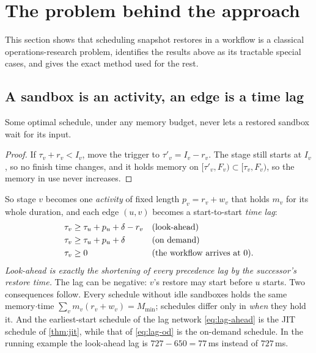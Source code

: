 \section{The problem behind the approach}
\label{sec:th-rcpsp}

This section shows that scheduling snapshot restores in a workflow is a classical
operations-research problem, identifies the results above as its tractable special cases, and
gives the exact method used for the rest.

\subsection{A sandbox is an activity, an edge is a time lag}

\begin{lemma}
\label{lem:noidle}
Some optimal schedule, under any memory budget, never lets a restored sandbox wait for its
input.
\end{lemma}

\begin{proof}
If $\tau_v + r_v < I_v$, move the trigger to $\tau'_v = I_v - r_v$. The stage still starts at
$I_v$, so no finish time changes, and it holds memory on $[\tau'_v, F_v) \subset [\tau_v, F_v)$,
so the memory in use never increases.
\end{proof}

So stage $v$ becomes one \emph{activity} of fixed length $p_v = r_v + w_v$ that holds $m_v$ for
its whole duration, and each edge $(u, v)$ becomes a start-to-start \emph{time lag}:
\begin{align}
  \tau_v &\ge \tau_u + p_u + \delta - r_v && \text{(look-ahead)} \label{eq:lag-ahead}\\
  \tau_v &\ge \tau_u + p_u + \delta       && \text{(on demand)}  \label{eq:lag-od}\\
  \tau_v &\ge 0 && \text{(the workflow arrives at $0$).} \notag
\end{align}
\emph{Look-ahead is exactly the shortening of every precedence lag by the successor's restore
time.} The lag can be negative: $v$'s restore may start before $u$ starts. Two consequences
follow. Every schedule without idle sandboxes holds the same memory$\cdot$time
$\sum_v m_v (r_v + w_v) = M_{\min}$; schedules differ only in \emph{when} they hold it. And the
earliest-start schedule of the lag network \eqref{eq:lag-ahead} is the JIT schedule of
\cref{thm:jit}, while that of \eqref{eq:lag-od} is the on-demand schedule. In the running
example the look-ahead lag is $727 - 650 = 77$\,ms instead of $727$\,ms.

